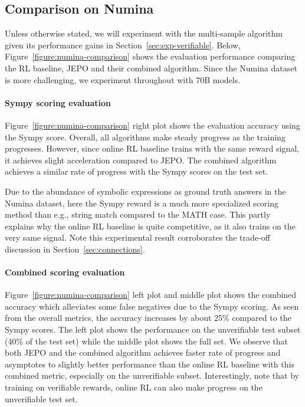 \documentclass{article}
\theoremstyle{definition}
\begin{document}
\subsection{Comparison on Numina}


Unless otherwise stated, we will experiment with the multi-sample algorithm given its performance gains in Section~\ref{sec:exp-verifiable}. Below, Figure~\ref{figure:numina-comparison} shows the evaluation performance comparing the RL baseline, JEPO and their combined algorithm. Since the Numina dataset is more challenging, we experiment throughout with 70B models.

\paragraph{Sympy scoring evaluation}
Figure~\ref{figure:numina-comparison} 
 right plot shows the evaluation accuracy using the Sympy score. Overall, all algorithms make steady progress as the training progresses. However, since online RL baseline trains with the same reward signal, it achieves slight acceleration compared to JEPO. The combined algorithm achieves a similar rate of progress with the Sympy scores on the test set.


Due to the abundance of symbolic expressions as ground truth answers in the Numina dataset, here the Sympy reward is a much more specialized scoring method than e.g., string match compared to the MATH case. This partly explains why the online RL baseline is quite competitive, as it also trains on the very same signal. Note this experimental result corroborates the trade-off discussion in Section~\ref{sec:connections}.

\paragraph{Combined scoring evaluation}
Figure~\ref{figure:numina-comparison} left plot and middle plot shows the combined accuracy which alleviates some false negatives due to the Sympy scoring. As seen from the overall metrics, the accuracy increases by about 25\% compared to the Sympy scores. The left plot shows the performance on the unverifiable test subset (40\% of the test set) while the middle plot shows the full set. We observe that both JEPO and the combined algorithm achieves faster rate of progress and asymptotes to slightly better performance than the online RL baseline with this combined metric, especially on the unverifiable subset. Interestingly, note that by training on verifiable rewards, online RL can also make progress on the unverifiable test set.
\end{document}
